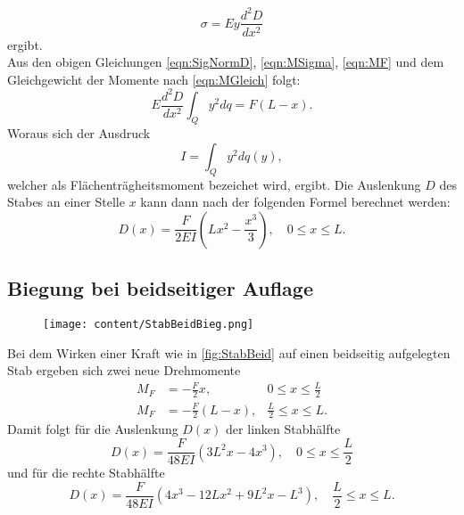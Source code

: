 \begin{equation}
    \label{eqn:SigNormD}
    \sigma = Ey\frac{d^2D}{dx^2}
\end{equation}
ergibt. \\
Aus den obigen Gleichungen \eqref{eqn:SigNormD}, \eqref{eqn:MSigma}, \eqref{eqn:MF} und dem Gleichgewicht der Momente nach \eqref{eqn:MGleich} folgt:
\begin{equation}
    E\frac{d^2D}{dx^2} \int_Q y^2dq = F(L-x).
\end{equation}
Woraus sich der Ausdruck
\begin{equation}
    I = \int_Q y^2dq(y),
\end{equation}
welcher als Flächenträgheitsmoment bezeichet wird, ergibt.
Die Auslenkung $D$ des Stabes an einer Stelle $x$ kann dann nach der folgenden Formel berechnet werden:
\begin{equation}
    \label{eqn:DvonX}
    D\left(x\right) = \frac{F}{2EI}\left(Lx^2-\frac{x^3}{3}\right),\quad 0\leq x \leq L.
\end{equation}
\subsection{Biegung bei beidseitiger Auflage}
\label{subsec:BeidseitigeAuflage}
\begin{figure}[H]
    \centering
    \texttt{[image: content/StabBeidBieg.png]}
    \label{fig:StabBeid}
\end{figure}
Bei dem Wirken einer Kraft wie in \autoref{fig:StabBeid} auf einen beidseitig aufgelegten Stab ergeben sich zwei neue Drehmomente
\begin{align}
    M_F &= -\frac{F}{2}x, &0 \leq x \leq \frac{L}{2}\\
    M_F &= -\frac{F}{2}(L-x), &\frac{L}{2} \leq x \leq L.
\end{align}
Damit folgt für die Auslenkung $D(x)$ der linken Stabhälfte
\begin{equation}
    D(x) = \frac{F}{48EI}\left(3L^2x-4x^3\right), \quad 0 \leq x \leq \frac{L}{2}
\end{equation}
und für die rechte Stabhälfte
\begin{equation}
    D(x) = \frac{F}{48EI}\left(4x^3 - 12Lx^2 + 9L^2x - L^3\right), \quad \frac{L}{2} \leq x \leq L.
\end{equation}


